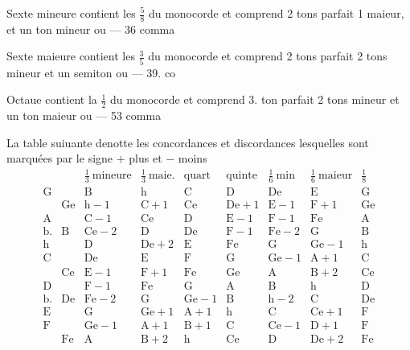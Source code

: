 \documentclass[11pt,a4paper]{article}
\begin{document}
Sexte mineure contient les $\frac{5}{8}$ du monocorde et comprend 2 tons parfait 1  maieur, et un ton mineur ou --- 36 comma

Sexte maieure contient les $\frac{3}{5}$ du monocorde et comprend 2 tons parfait 2 tons mineur et un semiton ou --- 39. co

Octaue contient la $\frac{1}{2}$ du monocorde et comprend 3. ton parfait 2 tons mineur et un ton maieur ou --- 53 comma

La table suiuante denotte les concordances et discordances lesquelles sont marquées par le signe $+$ plus et $-$ moins
\[
\begin{array}{ll|l|l|l|l|l|l|l}
 & & \frac{1}{3}\ \text{mineure} & \frac{1}{3}\ \text{maie.} & \text{quart} & \text{quinte} & \frac{1}{6}\ \text{min} & \frac{1}{6}\ \text{maieur} & \frac{1}{8} \\ \hline
\text{G} & & \text{B} & \text{h} & \text{C} & \text{D} & \text{De} & \text{E} & \text{G} \\
 & \text{Ge} & \text{h}-1 & \text{C}+1 & \text{Ce} & \text{De}+1 & \text{E}-1 & \text{F}+1 & \text{Ge} \\
\text{A} & & \text{C}-1 & \text{Ce} & \text{D} & \text{E}-1 & \text{F}-1 & \text{Fe} & \text{A} \\
\text{b.} & \text{B} & \text{Ce}-2 & \text{D} & \text{De} & \text{F}-1 & \text{Fe}-2 & \text{G} & \text{B} \\
\text{h} & & \text{D} & \text{De}+2 & \text{E} & \text{Fe} & \text{G} & \text{Ge}-1 & \text{h} \\
\text{C} & & \text{De} & \text{E} & \text{F} & \text{G} & \text{Ge}-1 & \text{A}+1 & \text{C} \\
 & \text{Ce} & \text{E}-1 & \text{F}+1 & \text{Fe} & \text{Ge} & \text{A} & \text{B}+2 & \text{Ce} \\
\text{D} & & \text{F}-1 & \text{Fe} & \text{G} & \text{A} & \text{B} & \text{h} & \text{D} \\
\text{b.} & \text{De} & \text{Fe}-2 & \text{G} & \text{Ge}-1 & \text{B} & \text{h}-2 & \text{C} & \text{De} \\
\text{E} & & \text{G} & \text{Ge}+1 & \text{A}+1 & \text{h} & \text{C} & \text{Ce}+1 & \text{F} \\
\text{F} & & \text{Ge}-1 & \text{A}+1 & \text{B}+1 & \text{C} & \text{Ce}-1 & \text{D}+1 & \text{F} \\
 & \text{Fe} & \text{A} & \text{B}+2 & \text{h} & \text{Ce} & \text{D} & \text{De}+2 & \text{Fe}
\end{array}
\]
\end{document}
